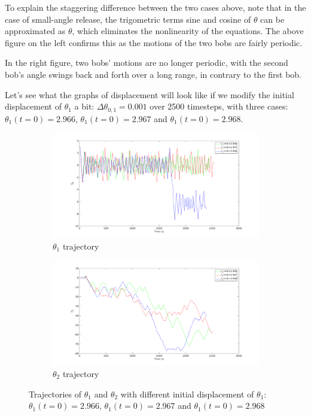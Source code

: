 \documentclass{article}
\begin{document}
To explain the staggering difference between the two cases above, note that in the case of small-angle release, the trigometric terms sine and cosine of $\theta$ can be approximated as $\theta$, which eliminates the nonlinearity of the equations. The above figure on the left confirms this as the motions of the two bobs are fairly periodic.

In the right figure, two bobs' motions are no longer periodic, with the second bob's angle swings back and forth over a long range, in contrary to the first bob.

Let's see what the graphs of displacement will look like if we modify the initial displacement of $\theta_1$ a bit: $\Delta \theta_{0,1} = 0.001$ over 2500 timesteps, with three cases: $\theta_1(t=0)=2.966$, $\theta_1(t=0)=2.967$ and $\theta_1(t=0)=2.968$.

\begin{figure}[!htbp]
  \begin{subfigure}[b]{0.5\textwidth}
    \includegraphics[width=\textwidth]{theta1.png}
    \caption{$\theta_1$ trajectory}
    \label{fig:f1}
  \end{subfigure}
  \hfill
  \begin{subfigure}[b]{0.5\textwidth}
    \includegraphics[width=\textwidth]{theta2.png}
    \caption{$\theta_2$ trajectory}
    \label{fig:f2}
  \end{subfigure}
  \caption{Trajectories of $\theta_1$ and $\theta_2$ with different initial displacement of $\theta_1$: $\theta_1(t=0)=2.966$, $\theta_1(t=0)=2.967$ and $\theta_1(t=0)=2.968$}
\end{figure}
\end{document}
